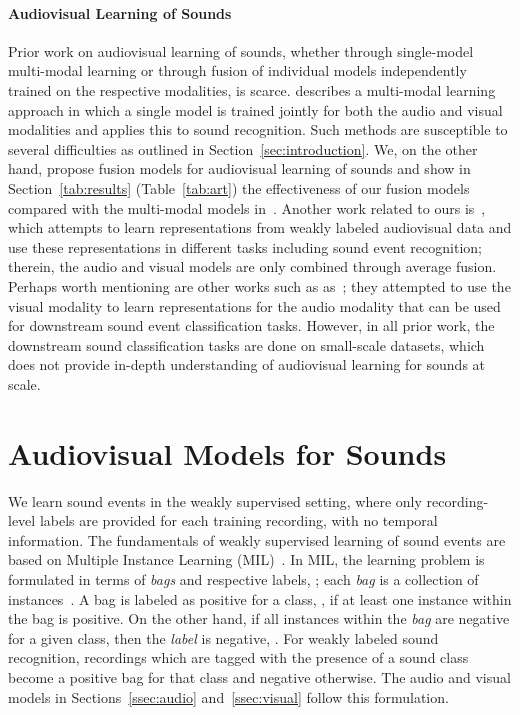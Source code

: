 \documentclass{article}
\begin{document}
\paragraph{Audiovisual Learning of Sounds}
Prior work on audiovisual learning of sounds, whether through single-model multi-modal learning or through fusion of individual models independently trained on the respective modalities, is scarce.
\cite{Wang2019} describes a multi-modal learning approach in which a single model is trained jointly for both the audio and visual modalities and applies this to sound recognition. 
Such methods are susceptible to several difficulties as outlined in Section~\ref{sec:introduction}.
We, on the other hand, propose fusion models for audiovisual learning of sounds and show in Section~\ref{tab:results} (Table~\ref{tab:art}) the effectiveness of our fusion models compared with the multi-modal models in~\cite{Wang2019}.
Another work related to ours is~\cite{parekh2019weakly}, which attempts to learn representations from weakly labeled audiovisual data and use these representations in different tasks including sound event recognition; therein, the audio and visual models are only combined through average fusion.
Perhaps worth mentioning are other works such as  as~\cite{Aytar2016,Arandjelovic2017,alwassel2019self}; they attempted to use the visual modality to learn representations for the audio modality that can be used for downstream sound event classification tasks.
However, in all prior work, the downstream sound classification tasks are done on small-scale datasets, which does not provide in-depth understanding of audiovisual learning for sounds at scale.

\section{Audiovisual Models for Sounds}\label{sec:audvis}

We learn sound events in the weakly supervised setting, where only recording-level labels are provided for each training recording, with no temporal information.
The fundamentals of weakly supervised learning of sound events are based on Multiple Instance Learning (MIL)~\cite{Kumar2016}.
In MIL, the learning problem is formulated in terms of \emph{bags} and respective labels, ;
each {\em bag} is a collection of instances~\cite{andrews2003support}.
A bag is labeled as positive for a class, , if at least one instance within the bag is positive.
On the other hand, if all instances within the {\em bag} are negative for a given class, then the {\em label} is negative, .
For weakly labeled sound recognition, recordings which are tagged with the presence of a sound class become a positive bag for that class and negative otherwise.
The audio and visual models in Sections~\ref{ssec:audio} and~\ref{ssec:visual} follow this formulation.
\end{document}
